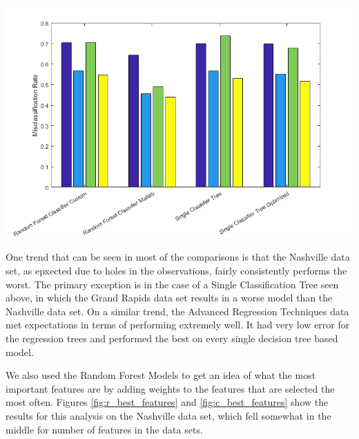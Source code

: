 \documentclass[10pt]{article}
\begin{document}
\begin{multicols}{2}
		\begin{center}
		\captionsetup{type=figure}
			\includegraphics[scale=0.40]{Images/ClassificationResults} \\
			\label{fig:fig_class_best}
		\end{center}

		One trend that can be seen in most of the comparisons is that the Nashville data set, as epxected due to holes in the observations, fairly consistently performs the worst. The primary exception is in the case of a Single Classification Tree seen above, in which the Grand Rapids data set results in a worse model than the Nashville data set. On a similar trend, the Advanced Regression Techniques data met expectations in terms of performing extremely well. It had very low error for the regression trees and performed the best on every single decision tree based model.
		
		We also used the Random Forest Models to get an idea of what the most important features are by adding weights to the features that are selected the most often. Figures \ref{fig:r_best_features} and \ref{fig:c_best_features} show the results for this analysis on the Nashville data set, which fell somewhat in the middle for number of features in the data sets. 


\end{multicols}
\end{document}
